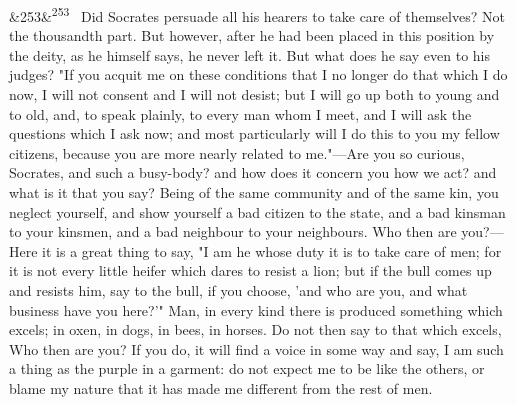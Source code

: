 \documentclass[12pt]{article}
\newcommand{\para}[1][]{\par\noindent\ifx&#1&\else\textsuperscript{\footnotesize #1}~\fi}
\begin{document}
\para[253] Did Socrates persuade all his hearers to take care of themselves? Not the thousandth part. But however, after he had been placed in this position by the deity, as he himself says, he never left it. But what does he say even to his judges? "If you acquit me on these conditions that I no longer do that which I do now, I will not consent and I will not desist; but I will go up both to young and to old, and, to speak plainly, to every man whom I meet, and I will ask the questions which I ask now; and most particularly will I do this to you my fellow citizens, because you are more nearly related to me."—Are you so curious, Socrates, and such a busy-body? and how does it concern you how we act? and what is it that you say? Being of the same community and of the same kin, you neglect yourself, and show yourself a bad citizen to the state, and a bad kinsman to your kinsmen, and a bad neighbour to your neighbours. Who then are you?—Here it is a great thing to say, "I am he whose duty it is to take care of men; for it is not every little heifer which dares to resist a lion; but if the bull comes up and resists him, say to the bull, if you choose, 'and who are you, and what business have you here?'" Man, in every kind there is produced something which excels; in oxen, in dogs, in bees, in horses. Do not then say to that which excels, Who then are you? If you do, it will find a voice in some way and say, I am such a thing as the purple in a garment: do not expect me to be like the others, or blame my nature that it has made me different from the rest of men.
\end{document}
